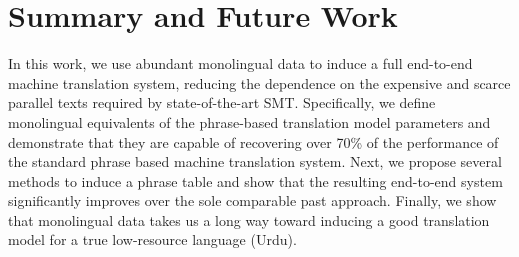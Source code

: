 \documentclass[11pt]{article}
\begin{document}




\section{Summary and Future Work} \label{sect:conc}



In this work, we use abundant monolingual data to induce a full end-to-end machine translation system, reducing the dependence on the expensive and scarce parallel texts required by state-of-the-art SMT. %
Specifically, we define monolingual equivalents of the phrase-based translation model parameters and demonstrate that they are capable of recovering over 70\% of the performance of the standard phrase based machine translation system.  Next, we propose several methods to induce a phrase table and show that the resulting end-to-end system significantly improves over the sole comparable past approach.  Finally, we show that monolingual data takes us a long way toward inducing a good translation model for a true low-resource language (Urdu).

\end{document}
